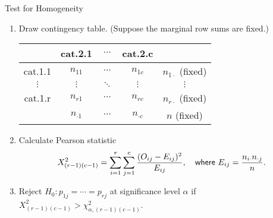 \begin{frame}{Test for Homogeneity}

\begin{enumerate}
	\justifying
	\item Draw contingency table. (Suppose the marginal row sums are fixed.)
	\begin{table}
		\footnotesize
		\centering
		\begin{tabular}{c|ccc|c}
			& cat.2.1 & $\cdots$ & cat.2.c & \\
			\hline
			cat.1.1 & $n_{11}$ & $\cdots$ & $n_{1c}$ & $n_{1\cdot}$ (fixed) \\
			$\vdots$ & $\vdots$ & $\ddots$ & $\vdots$ & $\vdots$ \\
			cat.1.r & $n_{r1}$ & $\cdots$ & $n_{rc}$ & $n_{r\cdot}$ (fixed) \\
			\hline
			& $n_{\cdot 1}$ & $\cdots$ & $n_{\cdot c}$ & $n$ (fixed)
		\end{tabular}
	\end{table}
	\item Calculate Pearson statistic
	\footnotesize
	\begin{align*}
	X^2_{(r-1)(c-1)} = \sum_{i=1}^r \sum_{j=1}^c \frac{(O_{ij}-E_{ij})^2}{E_{ij}}, \quad \mathsf{where\ } E_{ij} = \frac{n_{i\cdot}n_{\cdot j}}{n}.
	\end{align*}
	\normalsize
	\item Reject $H_0: p_{1j} = \cdots = p_{rj}$ at significance level $\alpha$ if $X^2_{(r-1)(c-1)} > \chi_{\alpha,(r-1)(c-1)}^2$.
\end{enumerate}


\end{frame}

